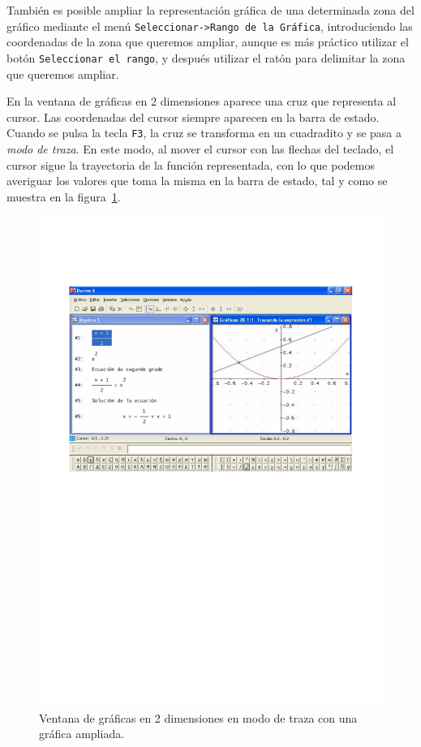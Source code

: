 También es posible ampliar la representación gráfica de una
determinada zona del gráfico mediante el menú
\texttt{Seleccionar->Rango de la Gráfica}, introduciendo las
coordenadas de la zona que queremos ampliar, aunque es más práctico
utilizar el botón \texttt{Seleccionar el rango}, y después utilizar
el ratón para delimitar la zona que queremos ampliar.

En la ventana de gráficas en 2 dimensiones aparece una cruz que
representa al cursor. Las coordenadas del cursor siempre aparecen en
la barra de estado. Cuando se pulsa la tecla \texttt{F3}, la cruz se
transforma en un cuadradito y se pasa a \emph{modo de traza}. En
este modo, al mover el cursor con las flechas del teclado, el cursor
sigue la trayectoria de la función representada, con lo que podemos
averiguar los valores que toma la misma en la barra de estado, tal y
como se muestra en la figura~\ref{g:modotraza}.

\begin{figure}[h!]
\begin{center}
\includegraphics[scale=0.9]{img/introduccion_derive/modotraza}
\caption{Ventana de gráficas en 2 dimensiones en modo de traza con
una gráfica ampliada.} \label{g:modotraza}
\end{center}
\end{figure}

